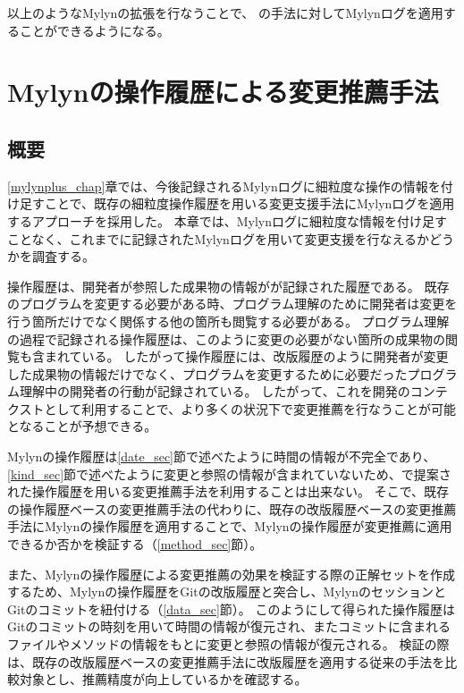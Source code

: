 \documentclass[a4paper]{jsbook}
\begin{document}
以上のようなMylynの拡張を行なうことで、
\cite{6233415,KatoJapanese:2011,ss2012-76,ss2013-84,Yamamori:2016}の手法に対してMylynログを適用することができるようになる。

\chapter{Mylynの操作履歴による変更推薦手法}\label{experiment_chap}
\section{概要}
\ref{mylynplus_chap}章では、今後記録されるMylynログに細粒度な操作の情報を付け足すことで、既存の細粒度操作履歴を用いる変更支援手法にMylynログを適用するアプローチを採用した。
本章では、Mylynログに細粒度な情報を付け足すことなく、これまでに記録されたMylynログを用いて変更支援を行なえるかどうかを調査する。

操作履歴は、開発者が参照した成果物の情報がが記録された履歴である。
既存のプログラムを変更する必要がある時、プログラム理解\cite{Storey:2006}のために開発者は変更を行う箇所だけでなく関係する他の箇所も閲覧する必要がある。
プログラム理解の過程で記録される操作履歴は、このように変更の必要がない箇所の成果物の閲覧も含まれている。
したがって操作履歴には、改版履歴のように開発者が変更した成果物の情報だけでなく、プログラムを変更するために必要だったプログラム理解中の開発者の行動が記録されている。
したがって、これを開発のコンテクストとして利用することで、より多くの状況下で変更推薦を行なうことが可能となることが予想できる。

Mylynの操作履歴は\ref{date_sec}節で述べたように時間の情報が不完全であり、\ref{kind_sec}節で述べたように変更と参照の情報が含まれていないため、\cite{6233415}で提案された操作履歴を用いる変更推薦手法を利用することは出来ない。
そこで、既存の操作履歴ベースの変更推薦手法の代わりに、既存の改版履歴ベースの変更推薦手法にMylynの操作履歴を適用することで、Mylynの操作履歴が変更推薦に適用できるか否かを検証する（\ref{method_sec}節）。

また、Mylynの操作履歴による変更推薦の効果を検証する際の正解セットを作成するため、Mylynの操作履歴をGitの改版履歴と突合し、MylynのセッションとGitのコミットを紐付ける（\ref{data_sec}節）。
このようにして得られた操作履歴はGitのコミットの時刻を用いて時間の情報が復元され、またコミットに含まれるファイルやメソッドの情報をもとに変更と参照の情報が復元される。
検証の際は、既存の改版履歴ベースの変更推薦手法に改版履歴を適用する従来の手法を比較対象とし、推薦精度が向上しているかを確認する。
\end{document}
